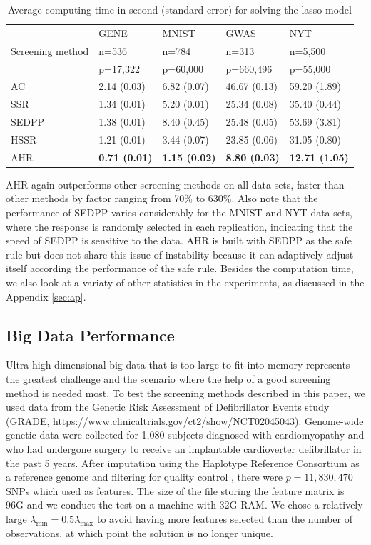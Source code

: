 \documentclass[]{interact}
\theoremstyle{plain}%
\theoremstyle{definition}
\theoremstyle{remark}
\begin{document}
\begin{table}[H]
\centering
\begin{tabular}{lllll}
\toprule
 & GENE & MNIST & GWAS & NYT \\
Screening method & n=536 & n=784 & n=313 & n=5,500 \\
       & p=17,322 & p=60,000 & p=660,496 & p=55,000 \\
\midrule
AC & 2.14 (0.03) & 6.82 (0.07) & 46.67 (0.13) & 59.20 (1.89) \\
SSR & 1.34 (0.01) & 5.20 (0.01) & 25.34 (0.08) & 35.40 (0.44) \\
SEDPP & 1.38 (0.01) & 8.40 (0.45) & 25.48 (0.05) & 53.69 (3.81) \\
HSSR & 1.21 (0.01) & 3.44 (0.07) & 23.85 (0.06) & 31.05 (0.80) \\
AHR & \textbf{0.71 (0.01)} & \textbf{1.15 (0.02)} & \textbf{8.80 (0.03)} & \textbf{12.71 (1.05)} \\
\bottomrule
\end{tabular}
\caption{Average computing time in second (standard error) for solving the lasso model}
\label{Tab:real}
\end{table}

AHR again outperforms other screening methods on all data sets, faster than other methods by factor ranging from 70\% to 630\%. Also note that the performance of SEDPP varies considerably for the MNIST and NYT data sets, where the response is randomly selected in each replication, indicating that the speed of SEDPP is sensitive to the data. AHR is built with SEDPP as the safe rule but does not share this issue of instability because it can adaptively adjust itself according the performance of the safe rule. Besides the computation time, we also look at a variaty of other statistics in the experiments, as discussed in the Appendix \ref{sec:ap}.

\subsection{Big Data Performance}

Ultra high dimensional big data that is too large to fit into memory represents the greatest challenge and the scenario where the help of a good screening method is needed most. To test the screening methods described in this paper, we used data from the Genetic Risk Assessment of Defibrillator Events study (GRADE, \url{https://www.clinicaltrials.gov/ct2/show/NCT02045043}). Genome-wide genetic data were collected for 1,080 subjects diagnosed with cardiomyopathy and who had undergone surgery to receive an implantable cardioverter defibrillator in the past 5 years. After imputation using the Haplotype Reference Consortium as a reference genome and filtering for quality control \citep{Das2016}, there were $p=11,830,470$ SNPs which used as features. The size of the file storing the feature matrix is 96G and we conduct the test on a machine with 32G RAM. We chose a relatively large $\lambda_{\min} =0.5\lambda_{\max}$ to avoid having more features selected than the number of observations, at which point the solution is no longer unique.
\end{document}
